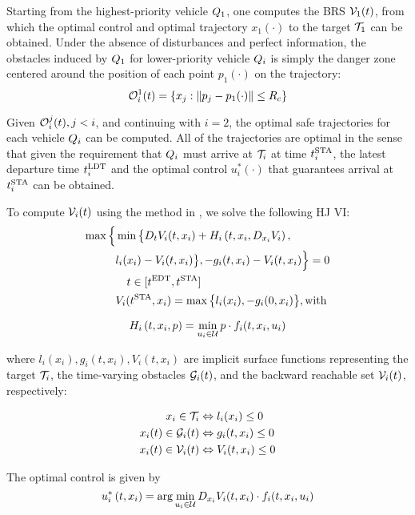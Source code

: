 Starting from the highest-priority vehicle $Q_1$, one computes the BRS $\mathcal{V}_1(t)$, from which the optimal control and optimal trajectory $x_1(\cdot)$ to the target $\mathcal{T}_1$ can be obtained. Under the absence of disturbances and perfect information, the obstacles induced by $Q_1$ for lower-priority vehicle $Q_i$ is simply the danger zone centered around the position of each point $p_1(\cdot)$ on the trajectory:
\vspace{-0.5em} 
\begin{equation}
\mathcal{O}_i^1(t) = \{x_j: \|p_j - p_1(\cdot)\|\le R_c\}
\end{equation}

Given $\mathcal{O}_i^j(t), j<i$, and continuing with $i = 2$, the optimal safe trajectories for each vehicle $Q_i$ can be computed. All of the trajectories are optimal in the sense that given the requirement that $Q_i$ must arrive at $\mathcal{T}_i$ at time $t^\text{STA}_i$, the latest departure time $t^\text{LDT}_i$ and the optimal control $u^*_i(\cdot)$ that guarantees arrival at $t^\text{STA}_i$ can be obtained.

To compute $\mathcal{V}_i(t)$ using the method in \cite{Fisac15}, we solve the following HJ VI:
\vspace{-0.5em} 
\begin{equation}
\label{eq:HJIVI}
\begin{aligned}
\max\Big\{&\min\big\{D_t V_i(t, x_i) + H_i\left(t, x_i, D_{x_i} V_i\right), \\
&l_i(x_i) - V_i(t, x_i)\big\}, -g_i(t, x_i) - V_i(t, x_i)\Big\} = 0 \\
&\quad t\in[t^\text{EDT},t^\text{STA}]\\
&V_i(t^\text{STA}, x_i) = \max\big\{l_i(x_i), -g_i(0, x_i)\big\}, \text{with}\\ 
\end{aligned}
\end{equation}

\begin{equation}
H_i\left(t, x_i, p\right) = \min_{u_i \in \mathcal{U}} p \cdot f_i(t, x_i, u_i)
\end{equation}

\noindent where $l_i(x_i), g_i(t,x_i),V_i(t,x_i)$ are implicit surface functions representing the target $\mathcal{T}_i$, the time-varying obstacles $\mathcal{G}_i(t)$, and the backward reachable set $\mathcal{V}_i(t)$, respectively: 

\begin{equation}
\label{eq:impl_surf}
\begin{aligned}
x_i \in \mathcal{T}_i &\Leftrightarrow l_i(x_i) \le 0 \\
x_i(t) \in \mathcal{G}_i(t) &\Leftrightarrow g_i(t,x_i) \le 0 \\
x_i(t) \in \mathcal{V}_i(t) &\Leftrightarrow V_i(t, x_i) \le 0
\end{aligned}
\end{equation}

The optimal control is given by
 \vspace{-0.4em} 
\begin{equation}
\label{eq:optCtrl}
u^*_i\left(t, x_i\right) = \arg \min_{u_i \in \mathcal{U}} D_{x_i} V_i(t,x_i) \cdot f_i(t, x_i, u_i)
\end{equation}